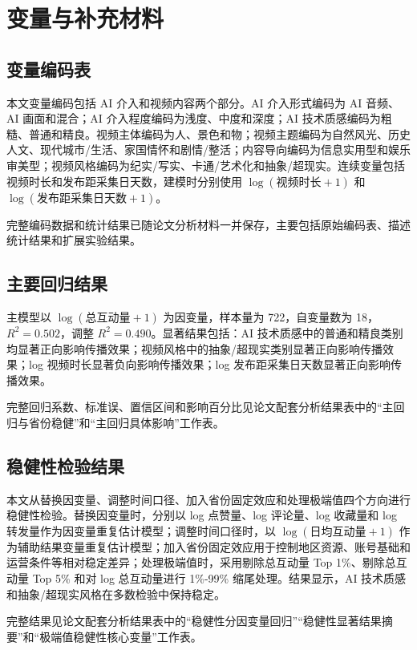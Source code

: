 \chapter{变量与补充材料}

\section{变量编码表}

本文变量编码包括 AI 介入和视频内容两个部分。AI 介入形式编码为 AI 音频、AI 画面和混合；AI 介入程度编码为浅度、中度和深度；AI 技术质感编码为粗糙、普通和精良。视频主体编码为人、景色和物；视频主题编码为自然风光、历史人文、现代城市/生活、家国情怀和剧情/整活；内容导向编码为信息实用型和娱乐审美型；视频风格编码为纪实/写实、卡通/艺术化和抽象/超现实。连续变量包括视频时长和发布距采集日天数，建模时分别使用 $\log(\text{视频时长}+1)$ 和 $\log(\text{发布距采集日天数}+1)$。

完整编码数据和统计结果已随论文分析材料一并保存，主要包括原始编码表、描述统计结果和扩展实验结果。

\section{主要回归结果}

主模型以 $\log(\text{总互动量}+1)$ 为因变量，样本量为 722，自变量数为 18，$R^2=0.502$，调整 $R^2=0.490$。显著结果包括：AI 技术质感中的普通和精良类别均显著正向影响传播效果；视频风格中的抽象/超现实类别显著正向影响传播效果；log 视频时长显著负向影响传播效果；log 发布距采集日天数显著正向影响传播效果。

完整回归系数、标准误、置信区间和影响百分比见论文配套分析结果表中的“主回归与省份稳健”和“主回归具体影响”工作表。

\section{稳健性检验结果}

本文从替换因变量、调整时间口径、加入省份固定效应和处理极端值四个方向进行稳健性检验。替换因变量时，分别以 log 点赞量、log 评论量、log 收藏量和 log 转发量作为因变量重复估计模型；调整时间口径时，以 $\log(\text{日均互动量}+1)$ 作为辅助结果变量重复估计模型；加入省份固定效应用于控制地区资源、账号基础和运营条件等相对稳定差异；处理极端值时，采用剔除总互动量 Top 1\%、剔除总互动量 Top 5\% 和对 log 总互动量进行 1\%-99\% 缩尾处理。结果显示，AI 技术质感和抽象/超现实风格在多数检验中保持稳定。

完整结果见论文配套分析结果表中的“稳健性分因变量回归”“稳健性显著结果摘要”和“极端值稳健性核心变量”工作表。

